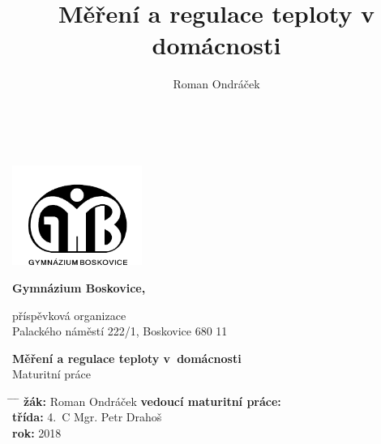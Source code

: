 \documentclass[12pt,a4paper]{article}
\author{Roman Ondráček}
\title{Měření a regulace teploty v domácnosti}
\begin{document}
\renewcommand{\baselinestretch}{1.5}
\pagestyle{empty}

\begin{center}

~ \vspace{64pt}

\includegraphics[width = 160px]{img/gymbos-logo.png}  \\[8pt]

\begin{Huge}
\textbf{Gymnázium Boskovice,} \\
\end{Huge}

\begin{large}
příspěvková organizace \\
Palackého náměstí 222/1, Boskovice 680 11 \\
\end{large}

\vspace{64pt}

\begin{Huge}
\textbf{Měření a regulace teploty v~domácnosti} \\
Maturitní práce \\
\end{Huge}

\vspace{64pt}

\begin{tabbing}
\hspace{8mm} \= \hspace{16mm} \= \hspace{48mm} \= \kill
\> \large \textbf{žák:} \> \large{Roman Ondráček} \> \large \textbf{vedoucí maturitní práce:} \\[4mm]
\> \large \textbf{třída:} \> \large{4.~C} \> \large{Mgr. Petr Drahoš} \\[4mm]
\> \large \textbf{rok:}   \> \large{2018} \\
\end{tabbing}

\end{center}
\end{document}
